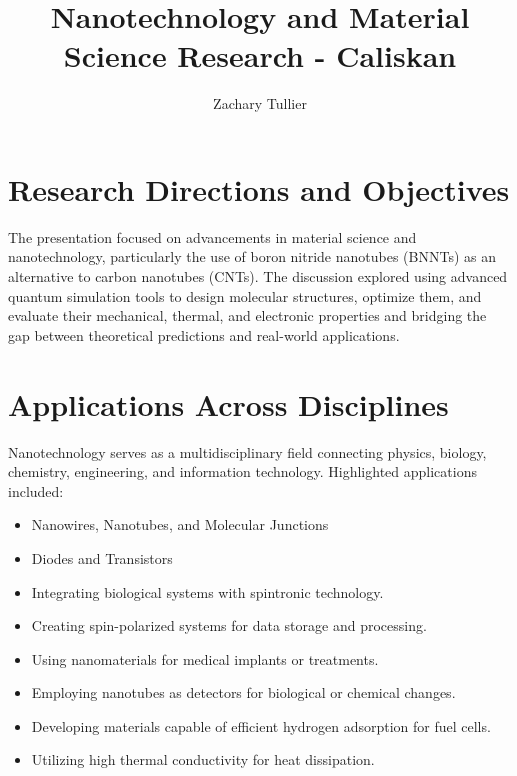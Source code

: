 \documentclass[12pt]{article}
\begin{document}
\singlespacing  %
\title{Nanotechnology and Material Science Research - Caliskan}

\author[1]{Zachary Tullier}
\date{}
\maketitle


\section{Research Directions and Objectives}
    The presentation focused on advancements in material science and nanotechnology, particularly the use of boron nitride nanotubes (BNNTs) as an alternative to carbon nanotubes (CNTs). The discussion explored using advanced quantum simulation tools to design molecular structures, optimize them, and evaluate their mechanical, thermal, and electronic properties and bridging the gap between theoretical predictions and real-world applications.


\section{Applications Across Disciplines}
    Nanotechnology serves as a multidisciplinary field connecting physics, biology, chemistry, engineering, and information technology. Highlighted applications included:
    \begin{itemize}
        \item Nanowires, Nanotubes, and Molecular Junctions
        \item Diodes and Transistors
        \item Integrating biological systems with spintronic technology.
        \item Creating spin-polarized systems for data storage and processing.
        \item Using nanomaterials for medical implants or treatments.
        \item Employing nanotubes as detectors for biological or chemical changes.
        \item Developing materials capable of efficient hydrogen adsorption for fuel cells.
        \item Utilizing high thermal conductivity for heat dissipation.
    \end{itemize}
\end{document}
